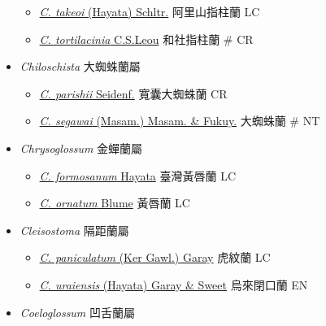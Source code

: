 \begin{itemize}
\begin{itemize}
        \item[] \href{http://www.theplantlist.org/tpl1.1/search?q=Cheirostylis+takeoi}{\textit{C. takeoi} (Hayata) Schltr.}   阿里山指柱蘭   LC
        \item[] \href{http://www.theplantlist.org/tpl1.1/search?q=Cheirostylis+tortilacinia}{\textit{C. tortilacinia} C.S.Leou}   和社指柱蘭  \# CR
  \end{itemize}
 \item[] \textit{Chiloschista} 大蜘蛛蘭屬
                                
  \begin{itemize}
        \item[] \href{http://www.theplantlist.org/tpl1.1/search?q=Chiloschista+parishii}{\textit{C. parishii} Seidenf.}   寬囊大蜘蛛蘭   CR
        \item[] \href{http://www.theplantlist.org/tpl1.1/search?q=Chiloschista+segawai}{\textit{C. segawai} (Masam.) Masam. \& Fukuy.}   大蜘蛛蘭  \# NT
  \end{itemize}
 \item[] \textit{Chrysoglossum} 金蟬蘭屬
                                
  \begin{itemize}
        \item[] \href{http://www.theplantlist.org/tpl1.1/search?q=Chrysoglossum+formosanum}{\textit{C. formosanum} Hayata}   臺灣黃唇蘭   LC
        \item[] \href{http://www.theplantlist.org/tpl1.1/search?q=Chrysoglossum+ornatum}{\textit{C. ornatum} Blume}   黃唇蘭   LC
  \end{itemize}
 \item[] \textit{Cleisostoma} 隔距蘭屬
                                
  \begin{itemize}
        \item[] \href{http://www.theplantlist.org/tpl1.1/search?q=Cleisostoma+paniculatum}{\textit{C. paniculatum} (Ker Gawl.) Garay}   虎紋蘭   LC
        \item[] \href{http://www.theplantlist.org/tpl1.1/search?q=Cleisostoma+uraiensis}{\textit{C. uraiensis} (Hayata) Garay \& Sweet}   烏來閉口蘭   EN
  \end{itemize}
 \item[] \textit{Coeloglossum} 凹舌蘭屬
                                

\end{itemize}
